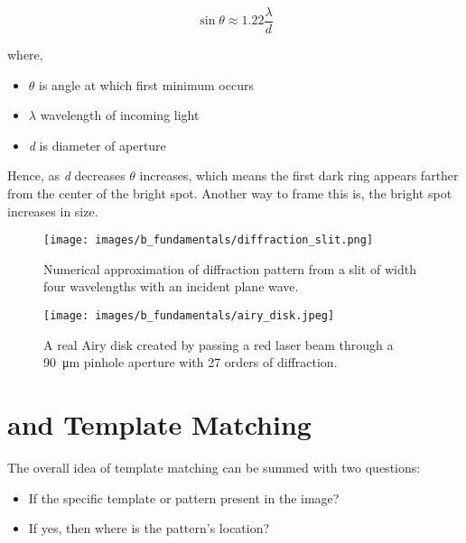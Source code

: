     \vspace{5mm}
    \begin{equation}\label{eqn:objective}
        \sin \theta \approx 1.22 \frac{\lambda}{d}
    \end{equation}

    \vspace{5mm}
    \noindent where,
    \begin{itemize}
        \item $\theta$ is angle at which first minimum occurs
        \item $\lambda$ wavelength of incoming light
        \item \emph{d} is diameter of aperture
    \end{itemize}
    
    \vspace{5mm}
    \noindent Hence, as \emph{d} decreases $\theta$ increases, which means the first dark ring appears farther from the center of the bright spot. Another way to frame this is, the bright spot increases in size.

    \begin{figure}[h]
        \centering
        \texttt{[image: images/b\_fundamentals/diffraction\_slit.png]}
        \caption{Numerical approximation of diffraction pattern from a slit of width four wavelengths with an incident plane wave. \cite{img_diffraction_slit}}
        \label{subfig:diffraction_slit}
    \end{figure}

    \begin{figure}[h]
        \centering
        \texttt{[image: images/b\_fundamentals/airy\_disk.jpeg]}
        \caption{A real Airy disk created by passing a red laser beam through a \SI{90}{\micro\meter} pinhole aperture with 27 orders of diffraction. \cite{img_airy_disk}}
        \label{subfig:airy_disk}
    \end{figure}


    \section*{ and Template Matching}\label{section:ncc}

    The overall idea of template matching can be summed with two questions:
    
    \begin{itemize}
        \item If the specific template or pattern present in the image?
        \item If yes, then where is the pattern's location?
    \end{itemize}

